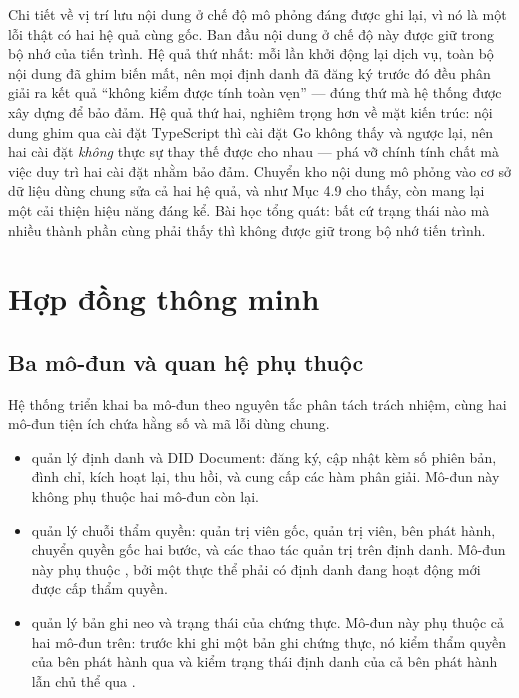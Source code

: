 Chi tiết về vị trí lưu nội dung ở chế độ mô phỏng đáng được ghi lại, vì nó là một lỗi thật có hai hệ quả cùng gốc. Ban đầu nội dung ở chế độ này được giữ trong bộ nhớ của tiến trình. Hệ quả thứ nhất: mỗi lần khởi động lại dịch vụ, toàn bộ nội dung đã ghim biến mất, nên mọi định danh đã đăng ký trước đó đều phân giải ra kết quả {``}không kiểm được tính toàn vẹn{''} --- đúng thứ mà hệ thống được xây dựng để bảo đảm. Hệ quả thứ hai, nghiêm trọng hơn về mặt kiến trúc: nội dung ghim qua cài đặt TypeScript thì cài đặt Go không thấy và ngược lại, nên hai cài đặt \emph{không} thực sự thay thế được cho nhau --- phá vỡ chính tính chất mà việc duy trì hai cài đặt nhằm bảo đảm. Chuyển kho nội dung mô phỏng vào cơ sở dữ liệu dùng chung sửa cả hai hệ quả, và như Mục 4.9 cho thấy, còn mang lại một cải thiện hiệu năng đáng kể. Bài học tổng quát: bất cứ trạng thái nào mà nhiều thành phần cùng phải thấy thì không được giữ trong bộ nhớ tiến trình.

\section{Hợp đồng thông minh}

\subsection{Ba mô-đun và quan hệ phụ thuộc}

Hệ thống triển khai ba mô-đun theo nguyên tắc phân tách trách nhiệm, cùng hai mô-đun tiện ích chứa hằng số và mã lỗi dùng chung.

\begin{itemize}
    \item {} quản lý định danh và DID Document: đăng ký, cập nhật kèm số phiên bản, đình chỉ, kích hoạt lại, thu hồi, và cung cấp các hàm phân giải. Mô-đun này không phụ thuộc hai mô-đun còn lại.
    \item {} quản lý chuỗi thẩm quyền: quản trị viên gốc, quản trị viên, bên phát hành, chuyển quyền gốc hai bước, và các thao tác quản trị trên định danh. Mô-đun này phụ thuộc , bởi một thực thể phải có định danh đang hoạt động mới được cấp thẩm quyền.
    \item {} quản lý bản ghi neo và trạng thái của chứng thực. Mô-đun này phụ thuộc cả hai mô-đun trên: trước khi ghi một bản ghi chứng thực, nó kiểm thẩm quyền của bên phát hành qua  và kiểm trạng thái định danh của cả bên phát hành lẫn chủ thể qua .
\end{itemize}

